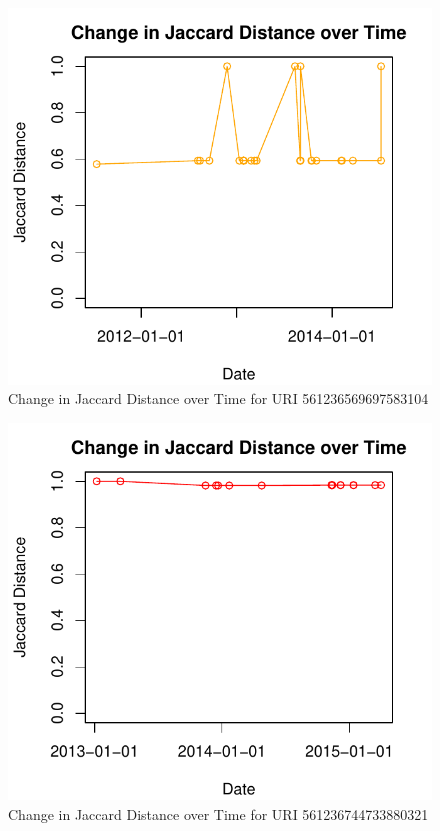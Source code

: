\documentclass[a4paper,12pt]{article}
\begin{document}
\begin{figure}[H]
    \centering
    \includegraphics{stats/q3/561236569697583104.pdf}
    \caption{Change in Jaccard Distance over Time for URI 561236569697583104}
\end{figure}

\begin{figure}[H]
    \centering
    \includegraphics{stats/q3/561236744733880321.pdf}
    \caption{Change in Jaccard Distance over Time for URI 561236744733880321}
\end{figure}
\end{document}
